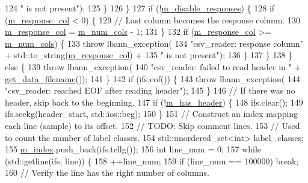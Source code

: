 \begin{DoxyCode}
124           \textcolor{stringliteral}{" is not present"});
125       \}
126     \}
127     \textcolor{keywordflow}{if} (!\hyperlink{classlbann_1_1csv__reader_a1e133c3585df5f131b4772f618e77ad2}{m\_disable\_responses}) \{
128       \textcolor{keywordflow}{if} (\hyperlink{classlbann_1_1csv__reader_a1cfa3562ecd0a7f6358290f299de5812}{m\_response\_col} < 0) \{
129         \textcolor{comment}{// Last column becomes the response column.}
130         \hyperlink{classlbann_1_1csv__reader_a1cfa3562ecd0a7f6358290f299de5812}{m\_response\_col} = \hyperlink{classlbann_1_1csv__reader_a7607d3f6b356538671147a0b8f7b09c8}{m\_num\_cols} - 1;
131       \}
132       \textcolor{keywordflow}{if} (\hyperlink{classlbann_1_1csv__reader_a1cfa3562ecd0a7f6358290f299de5812}{m\_response\_col} >= \hyperlink{classlbann_1_1csv__reader_a7607d3f6b356538671147a0b8f7b09c8}{m\_num\_cols}) \{
133         \textcolor{keywordflow}{throw} lbann\_exception(
134           \textcolor{stringliteral}{"csv\_reader: response column"} + std::to\_string(\hyperlink{classlbann_1_1csv__reader_a1cfa3562ecd0a7f6358290f299de5812}{m\_response\_col}) +
135           \textcolor{stringliteral}{" is not present"});
136       \}
137     \}
138   \} \textcolor{keywordflow}{else} \{
139     \textcolor{keywordflow}{throw} lbann\_exception(
140       \textcolor{stringliteral}{"csv\_reader: failed to read header in "} + \hyperlink{classlbann_1_1generic__data__reader_a56664e1b43f3fe923cf6d652f14b40a9}{get\_data\_filename}());
141   \}
142   \textcolor{keywordflow}{if} (ifs.eof()) \{
143     \textcolor{keywordflow}{throw} lbann\_exception(
144       \textcolor{stringliteral}{"csv\_reader: reached EOF after reading header"});
145   \}
146   \textcolor{comment}{// If there was no header, skip back to the beginning.}
147   \textcolor{keywordflow}{if} (!\hyperlink{classlbann_1_1csv__reader_a36d5e554882e8a32e1d111701af3bd90}{m\_has\_header}) \{
148     ifs.clear();
149     ifs.seekg(header\_start, std::ios::beg);
150   \}
151   \textcolor{comment}{// Construct an index mapping each line (sample) to its offset.}
152   \textcolor{comment}{// TODO: Skip comment lines.}
153   \textcolor{comment}{// Used to count the number of label classes.}
154   std::unordered\_set<int> label\_classes;
155   \hyperlink{classlbann_1_1csv__reader_a2a959e7839d2d11e2deba98ba1884006}{m\_index}.push\_back(ifs.tellg());
156   \textcolor{keywordtype}{int} line\_num = 0;
157   \textcolor{keywordflow}{while} (std::getline(ifs, line)) \{
158     ++line\_num;
159     \textcolor{keywordflow}{if} (line\_num == 100000) \textcolor{keywordflow}{break};
160     \textcolor{comment}{// Verify the line has the right number of columns.}

\end{DoxyCode}
